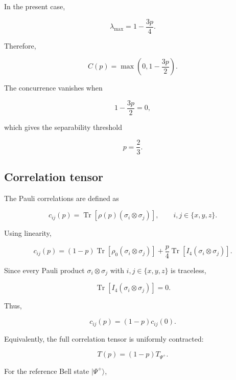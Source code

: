 In the present case,

\[
\lambda_{\max}
=
1-\frac{3p}{4}.
\]

Therefore,

\begin{equation}
C(p)
=
\max
\left(
0,
1-\frac{3p}{2}
\right).
\label{eq:appendix_depolarizing_concurrence}
\end{equation}

The concurrence vanishes when

\[
1-\frac{3p}{2}
=
0,
\]

which gives the separability threshold

\begin{equation}
p
=
\frac{2}{3}.
\label{eq:appendix_depolarizing_separability_threshold}
\end{equation}


\subsection*{Correlation tensor}

The Pauli correlations are defined as

\[
c_{ij}(p)
=
\operatorname{Tr}
\left[
\rho(p)
\left(
\sigma_i \otimes \sigma_j
\right)
\right],
\qquad
i,j \in \{x,y,z\}.
\]

Using linearity,

\[
c_{ij}(p)
=
(1-p)
\operatorname{Tr}
\left[
\rho_0
\left(
\sigma_i \otimes \sigma_j
\right)
\right]
+
\frac{p}{4}
\operatorname{Tr}
\left[
I_4
\left(
\sigma_i \otimes \sigma_j
\right)
\right].
\]

Since every Pauli product \( \sigma_i \otimes \sigma_j \) with \( i,j \in \{x,y,z\} \) is traceless,

\[
\operatorname{Tr}
\left[
I_4
\left(
\sigma_i \otimes \sigma_j
\right)
\right]
=
0.
\]

Thus,

\[
c_{ij}(p)
=
(1-p)c_{ij}(0).
\]

Equivalently, the full correlation tensor is uniformly contracted:

\begin{equation}
T(p)
=
(1-p)T_{\Psi^+}.
\label{eq:appendix_depolarizing_tensor_contraction}
\end{equation}

For the reference Bell state \( |\Psi^+\rangle \),

